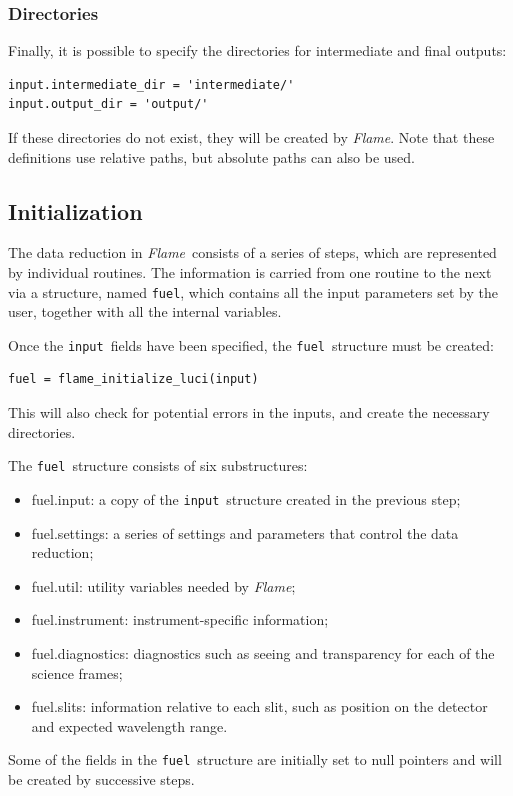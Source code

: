\documentclass[a4paper]{article}
\newcommand{\flame}{\emph{Flame}}
\newcommand{\fuel}{\texttt{fuel}}
\newcommand{\inp}{\texttt{input}}
\begin{document}
\begin{sloppypar}
\subsubsection{Directories}
Finally, it is possible to specify the directories for intermediate and final outputs:
\begin{lstlisting}
input.intermediate_dir = 'intermediate/'
input.output_dir = 'output/'
\end{lstlisting}
If these directories do not exist, they will be created by \flame. Note that these definitions use relative paths, but absolute paths can also be used.



\subsection{Initialization}

The data reduction in \flame\ consists of a series of steps, which are represented by individual routines. The information is carried from one routine to the next via a structure, named \fuel, which contains all the input parameters set by the user, together with all the internal variables.

Once the \inp\ fields have been specified, the \fuel\ structure must be created:
\begin{lstlisting}
fuel = flame_initialize_luci(input)
\end{lstlisting}
This will also check for potential errors in the inputs, and create the necessary directories.

The \fuel\ structure consists of six substructures:
\begin{itemize}
	\item fuel.input: a copy of the \inp\ structure created in the previous step;
  \item fuel.settings: a series of settings and parameters that control the data reduction;
	\item fuel.util: utility variables needed by \flame;
	\item fuel.instrument: instrument-specific information;
	\item fuel.diagnostics: diagnostics such as seeing and transparency for each of the science frames;
	\item fuel.slits: information relative to each slit, such as position on the detector and expected wavelength range.
\end{itemize}

Some of the fields in the \fuel\ structure are initially set to null pointers and will be created by successive steps.


\end{sloppypar}
\end{document}
